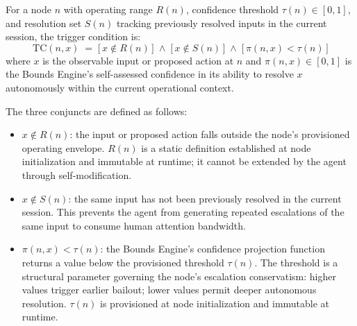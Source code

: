\begin{definition}
\label{def:tc}
For a node $n$ with operating range $R(n)$, confidence threshold $\tau(n) \in [0, 1]$, and resolution set $S(n)$ tracking previously resolved inputs in the current session, the trigger condition is:
\begin{equation}
\text{TC}(n, x)
\;=\;
\bigl[\,x \notin R(n)\,\bigr]
\;\land\;
\bigl[\,x \notin S(n)\,\bigr]
\;\land\;
\bigl[\,\pi(n, x) < \tau(n)\,\bigr]
\tag{TC}
\end{equation}
where $x$ is the observable input or proposed action at $n$ and $\pi(n, x) \in [0, 1]$ is the Bounds Engine's self-assessed confidence in its ability to resolve $x$ autonomously within the current operational context.
\end{definition}

The three conjuncts are defined as follows:

\begin{itemize}\itemsep=0pt
\item[$\textbf{Bound violation.}$] $x \notin R(n)$: the input or proposed action falls outside the node's provisioned operating envelope. $R(n)$ is a static definition established at node initialization and immutable at runtime; it cannot be extended by the agent through self-modification.

\item[$\textbf{Non-redundancy.}$] $x \notin S(n)$: the same input has not been previously resolved in the current session. This prevents the agent from generating repeated escalations of the same input to consume human attention bandwidth.

\item[$\textbf{Confidence deficit.}$] $\pi(n, x) < \tau(n)$: the Bounds Engine's confidence projection function returns a value below the provisioned threshold $\tau(n)$. The threshold is a structural parameter governing the node's escalation conservatism: higher values trigger earlier bailout; lower values permit deeper autonomous resolution. $\tau(n)$ is provisioned at node initialization and immutable at runtime.
\end{itemize}

